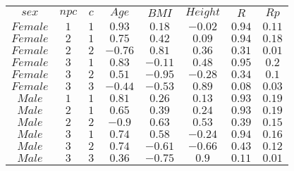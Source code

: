 \begin{tabular}{cccccccc}
$sex$ & $npc$ & $c$ & $Age$ & $BMI$ & $Height$ & $R$ & $Rp$\\
$Female$ & $1$ & $1$ & $0.93$ & $0.18$ & $-0.02$ & $0.94$ & $0.11$\\
$Female$ & $2$ & $1$ & $0.75$ & $0.42$ & $0.09$ & $0.94$ & $0.18$\\
$Female$ & $2$ & $2$ & $-0.76$ & $0.81$ & $0.36$ & $0.31$ & $0.01$\\
$Female$ & $3$ & $1$ & $0.83$ & $-0.11$ & $0.48$ & $0.95$ & $0.2$\\
$Female$ & $3$ & $2$ & $0.51$ & $-0.95$ & $-0.28$ & $0.34$ & $0.1$\\
$Female$ & $3$ & $3$ & $-0.44$ & $-0.53$ & $0.89$ & $0.08$ & $0.03$\\
$Male$ & $1$ & $1$ & $0.81$ & $0.26$ & $0.13$ & $0.93$ & $0.19$\\
$Male$ & $2$ & $1$ & $0.65$ & $0.39$ & $0.24$ & $0.93$ & $0.19$\\
$Male$ & $2$ & $2$ & $-0.9$ & $0.63$ & $0.53$ & $0.39$ & $0.15$\\
$Male$ & $3$ & $1$ & $0.74$ & $0.58$ & $-0.24$ & $0.94$ & $0.16$\\
$Male$ & $3$ & $2$ & $0.74$ & $-0.61$ & $-0.66$ & $0.43$ & $0.12$\\
$Male$ & $3$ & $3$ & $0.36$ & $-0.75$ & $0.9$ & $0.11$ & $0.01$\\
\end{tabular}
